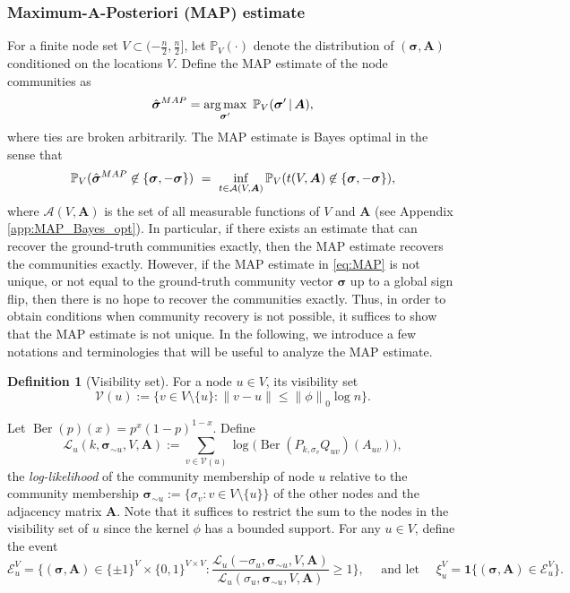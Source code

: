 \documentclass[letterpaper,11pt]{article}
\theoremstyle{definition}
\newtheorem{defn}{Definition}[section]
\def\1{\mathbf{1}}
\def\P{\mathbb{P}}
\def\bA{\bm{A}}
\newcommand{\bsigma}{\bm{\sigma}}
\def\cA{\mathcal{A}}
\def\cE{\mathcal{E}}
\def\cL{\mathcal{L}}
\def\cV{\mathcal{V}}
\def\torus{(-\frac{n}{2}, \frac{n}{2}]}
\def\weq{ \ = \ }
\newcommand{\Ber}{\operatorname{Ber}}
\newcommand{\zeronorm}[1]{{\lVert#1\rVert}_0}
\DeclareMathOperator*{\argmax}{arg\,max}
\numberwithin{equation}{section}
\newcommand{\map}{\hat{\bsigma}^{\rm MAP}}
\theoremstyle{definition}
\newtheorem{defn}{Definition}[section]
\def\1{\mathbf{1}}
\def\P{\mathbb{P}}
\def\bA{\bm{A}}
\newcommand{\bsigma}{\bm{\sigma}}
\def\cA{\mathcal{A}}
\def\cE{\mathcal{E}}
\def\cL{\mathcal{L}}
\def\cV{\mathcal{V}}
\def\torus{(-\frac{n}{2}, \frac{n}{2}]}
\def\weq{ \ = \ }
\newcommand{\Ber}{\operatorname{Ber}}
\newcommand{\zeronorm}[1]{{\lVert#1\rVert}_0}
\DeclareMathOperator*{\argmax}{arg\,max}
\numberwithin{equation}{section}
\newcommand{\map}{\hat{\bsigma}^{\rm MAP}}
\theoremstyle{thmstyletwo}%
\begin{document}
\subsubsection{Maximum-A-Posteriori (MAP) estimate} 
\label{sec:map_analysis}
For a finite node set $V \subset \torus$, let $\P_{V}(\cdot)$ denote the distribution of $(\bsigma,\bA)$ conditioned on the locations $V$. Define the MAP estimate of the node communities as 
\begin{equation}
    \map = \argmax_{\bsigma'}\ \P_{V}(\bsigma' \, | \, \bA),
    \label{eq:MAP}
\end{equation}
where ties are broken arbitrarily.
The MAP estimate is Bayes optimal in the sense that
\begin{equation}
\P_{V}( \map \not\in \{\bsigma,-\bsigma\} ) \weq \inf_{t \in \cA(V,\bA)} \P_V(t(V,\bA) \not\in \{\bsigma,-\bsigma\}),
\label{eq:MAP_Bayes_opt}
\end{equation}
where $\cA(V,\bA)$ is the set of all measurable functions of $V$ and $\bA$ (see Appendix \ref{app:MAP_Bayes_opt}). In particular, if there exists an estimate that can recover the ground-truth communities exactly, then the MAP estimate recovers the communities exactly. However, if the MAP estimate in \eqref{eq:MAP} is not unique, or not equal to the ground-truth community vector $\bsigma$ up to a global sign flip, then there is no hope to recover the communities exactly. Thus, in order to obtain conditions when community recovery is not possible, it suffices to show that the MAP estimate is not unique. In the following, we introduce a few notations and terminologies that will be useful to analyze the MAP estimate.
\begin{defn}[Visibility set]
\label{defn:visibility_set}
For a node $u \in V$, its visibility set
\[
\cV(u) := \{v \in V\setminus \{u\}  : \|v-u\| \le \zeronorm{\phi} \log n\}.
\]
\end{defn}
\noindent Let $\Ber(p)(x) = p^x(1-p)^{1-x}$. Define 
\[
\cL_u(k,\bsigma_{\sim u},V,\bA) := \sum_{v\in \cV(u)}\log \big(\Ber(P_{k,\sigma_v}Q_{uv})(A_{uv})\big),
\]
the \emph{log-likelihood} of the community membership of node $u$ relative to the community membership $\bsigma_{\sim u}:= \{\sigma_v: v\in V \setminus \{u\}\}$ of the other nodes and the adjacency matrix $\bA$. Note that it suffices to restrict the sum to the nodes in the visibility set of $u$ since the kernel $\phi$ has a bounded support. For any $u\in V$, define the event
\begin{equation}
\cE_{u}^V
=\bigg\{(\bsigma,\bA) \in \{\pm1\}^V \times \{0,1\}^{V\times V} : \frac{\cL_u(-\sigma_u,\bsigma_{\sim u},V,\bA)}{\cL_u(\sigma_u,\bsigma_{\sim u},V,\bA)}\ge 1\bigg\}, \quad \text{ and let } \quad \xi_u^V = \1\{(\bsigma,\bA)\in \cE_u^V\}.
\label{eq:ubad}
\end{equation}
\end{document}
